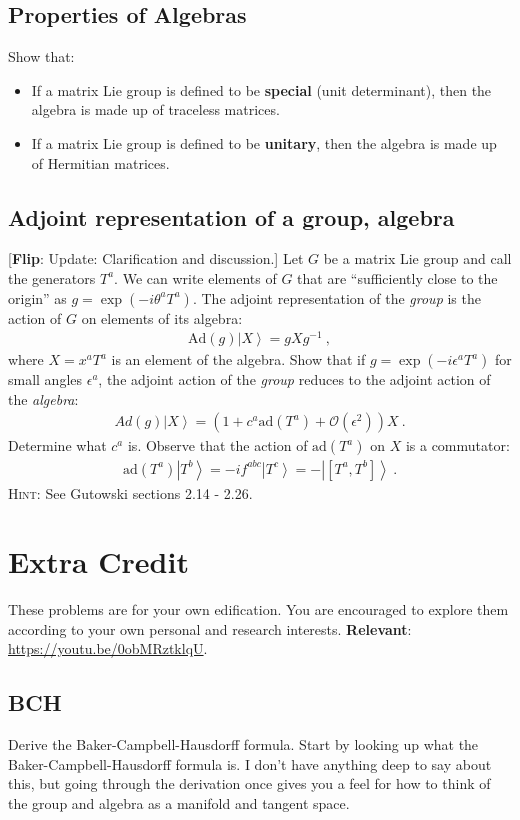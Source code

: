 \documentclass[12pt]{article}
\numberwithin{equation}{subsection}    %
\newcommand{\ket}[1]{\left|#1\right\rangle}    %
\newcommand{\flip}[1]{{\color{red} [\textbf{Flip}: {#1}]}}
\begin{document}
\subsection{Properties of Algebras}

Show that:
\begin{itemize}
  \item If a matrix Lie group is defined to be \textbf{special} (unit determinant), then the algebra is made up of traceless matrices.
  \item If a matrix Lie group is defined to be \textbf{unitary}, then the algebra is made up of Hermitian matrices.
\end{itemize}

\subsection{Adjoint representation of a group, algebra}

\flip{Update: Clarification and discussion.} Let $G$ be a matrix Lie group and call the generators $T^a$. We can write elements of $G$ that are ``sufficiently close to the origin'' as $g = \exp(-i\theta^a T^a)$. The adjoint representation of the \emph{group} is the action of $G$ on elements of its algebra:
\begin{align}
  \text{Ad}(g) \ket{X} = g X g^{-1} \ ,
\end{align}
where $X = x^a T^a$ is an element of the algebra.
Show that if $g = \exp(-i\epsilon^a T^a)$ for small angles $\epsilon^a$, the adjoint action of the \emph{group} reduces to the adjoint action of the \emph{algebra}:
\begin{align}
  Ad(g) \ket{X} = \left(1 + c^a \text{ad}(T^a) + \mathcal O(\epsilon^2) \right) X \ .
\end{align}
Determine what $c^a$ is. Observe that the action of $\text{ad}(T^a)$ on $X$ is a commutator:
\begin{align}
    \text{ad}(T^a)\ket{T^b} = -if^{abc}\ket{T^c} = -\ket{[T^a,T^b]} \ .
\end{align}
%
\textsc{Hint}: See Gutowski sections 2.14 - 2.26.

\section*{Extra Credit}

These problems are for your own edification. You are encouraged to explore them according to your own personal and research interests. \textbf{Relevant}: \url{https://youtu.be/0obMRztklqU}.


\subsection*{BCH}

Derive the Baker-Campbell-Hausdorff formula. Start by looking up what the Baker-Campbell-Hausdorff formula is. I don't have anything deep to say about this, but going through the derivation once gives you a feel for how to think of the group and algebra as a manifold and tangent space.
\end{document}
